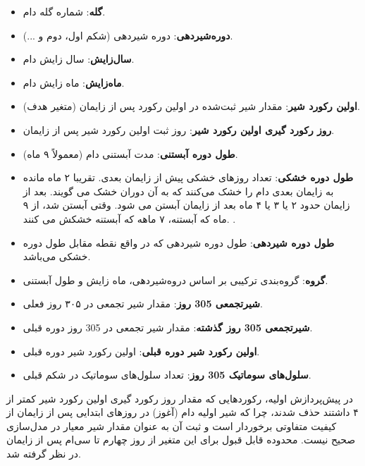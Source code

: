 \begin{itemize}
	\item \textbf{گله}: شماره گله دام.
	\item \textbf{دوره‌شیردهی}: دوره شیردهی (شکم اول، دوم و ...).
	\item \textbf{سال‌زایش}: سال زایش دام.
	\item \textbf{ماه‌زایش}: ماه زایش دام.
	\item \textbf{اولین رکورد شیر}: مقدار شیر ثبت‌شده در اولین رکورد پس از زایمان (متغیر هدف).
	\item \textbf{روز رکورد گیری اولین رکورد شیر}: روز ثبت اولین رکورد شیر پس از زایمان.
	\item \textbf{طول دوره آبستنی}: مدت آبستنی دام (معمولاً ۹ ماه).
	\item \textbf{طول دوره خشکی}: تعداد روزهای خشکی پیش از زایمان بعدی. تقریبا ۲ ماه مانده به زایمان بعدی دام را خشک می‌کنند که به آن دوران خشک می گویند. 	 بعد از زایمان حدود ۲ یا ۳ یا ۴ ماه بعد از زایمان آبستن می شود. وقتی آبستن شد، از ۹ ماه که آبستنه، ۷ ماهه که آبستنه خشکش می کنند.
	.
	\item \textbf{طول دوره شیردهی}: طول دوره شیردهی که در واقع نقطه مقابل طول دوره خشکی می‌باشد.
	\item \textbf{گروه}: گروه‌بندی ترکیبی بر اساس دروه‌شیردهی، ماه زایش و طول آبستنی.
	\item \textbf{شیر‌تجمعی 305 روز}: مقدار شیر تجمعی در ۳۰۵ روز فعلی.
	\item \textbf{شیر‌تجمعی 305 روز گذشته}: مقدار شیر تجمعی در 305 روز دوره قبلی.
	\item \textbf{اولین رکورد شیر دوره قبلی}: اولین رکورد شیر دوره قبلی.
	\item \textbf{سلول‌های سوماتیک 305 روز}: تعداد سلول‌های سوماتیک در شکم قبلی.
\end{itemize}

در پیش‌پردازش اولیه، رکوردهایی که مقدار روز رکورد گیری اولین رکورد شیر کمتر از ۴ داشتند حذف شدند، چرا که شیر اولیه دام (آغوز) در روزهای ابتدایی پس از زایمان از کیفیت متفاوتی برخوردار است و ثبت آن به عنوان مقدار شیر معیار در مدل‌سازی صحیح نیست. محدوده قابل قبول برای این متغیر از روز چهارم تا سی‌ام پس از زایمان در نظر گرفته شد.

